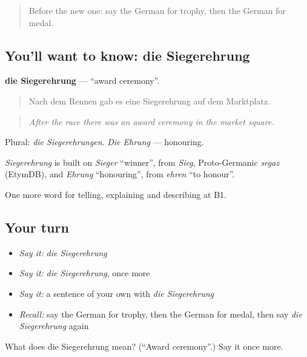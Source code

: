 \label{lesson:GE-C509-siegerehrung}



\begin{quote}
Before the new one: say the German for trophy, then the German for medal.
\end{quote}

\subsection*{You'll want to know: die Siegerehrung}
\textbf{die Siegerehrung} — \textquotedblleft{}award ceremony\textquotedblright{}.

\begin{quote}
Nach dem Rennen gab es eine Siegerehrung auf dem Marktplatz.
\end{quote}

\begin{quote}
\emph{After the race there was an award ceremony in the market square.}
\end{quote}

Plural: \emph{die Siegerehrungen}. \emph{Die Ehrung} — honouring.

\begin{cousinweb}
\emph{Siegerehrung} is built on \emph{Sieger} \textquotedblleft{}winner\textquotedblright{}, from \emph{Sieg}, Proto-Germanic \emph{segaz} (EtymDB), and \emph{Ehrung} \textquotedblleft{}honouring\textquotedblright{}, from \emph{ehren} \textquotedblleft{}to honour\textquotedblright{}.
\end{cousinweb}

\begin{grammarlens}[title={What you've built}]
One more word for telling, explaining and describing at B1.
\end{grammarlens}

\subsection*{Your turn}
\begin{itemize}
\raggedright
  \item \emph{Say it:} \emph{die Siegerehrung}
  \item \emph{Say it:} \emph{die Siegerehrung}, once more
  \item \emph{Say it:} a sentence of your own with \emph{die Siegerehrung}
  \item \emph{Recall:} say the German for trophy, then the German for medal, then say \emph{die Siegerehrung} again
\end{itemize}

\begin{tcolorbox}[breakable,colback=teal!4,colframe=teal!35!black,title={Before you move on}]
What does die Siegerehrung mean? (\textquotedblleft{}Award ceremony\textquotedblright{}.) Say it once more.
\end{tcolorbox}
